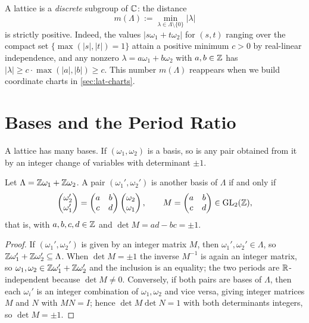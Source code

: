 \begin{remark}
\label{rem:lat-discrete}
A lattice is a \emph{discrete} subgroup of \(\mathbb{C}\): the distance
\[
  m(\Lambda) := \min_{\lambda \in \Lambda \setminus \{0\}} |\lambda|
\]
is strictly positive. Indeed, the values \(|s\omega_1 + t\omega_2|\) for
\((s,t)\) ranging over the compact set \(\{ \max(|s|,|t|) = 1\}\) attain a
positive minimum \(c > 0\) by real-linear independence, and any nonzero
\(\lambda = a\omega_1 + b\omega_2\) with \(a,b \in \mathbb{Z}\) has
\(|\lambda| \ge c \cdot \max(|a|,|b|) \ge c\). This number \(m(\Lambda)\) reappears
when we build coordinate charts in \cref{sec:lat-charts}.
\end{remark}

\section{Bases and the Period Ratio}
\label{sec:lat-basis}

A lattice has many bases. If \((\omega_1, \omega_2)\) is a basis, so is any pair
obtained from it by an integer change of variables with determinant \(\pm 1\).

\begin{proposition}
\label{prop:lat-basis-change}
Let \(\Lambda = \mathbb{Z}\omega_1 + \mathbb{Z}\omega_2\). A pair \((\omega_1', \omega_2')\) is
another basis of \(\Lambda\) if and only if
\[
  \begin{pmatrix} \omega_2' \\ \omega_1' \end{pmatrix}
  =
  \begin{pmatrix} a & b \\ c & d \end{pmatrix}
  \begin{pmatrix} \omega_2 \\ \omega_1 \end{pmatrix},
  \qquad
  M = \begin{pmatrix} a & b \\ c & d \end{pmatrix} \in \mathrm{GL}_2(\mathbb{Z}),
\]
that is, with \(a,b,c,d \in \mathbb{Z}\) and \(\det M = ad - bc = \pm 1\).
\end{proposition}

\begin{proof}
If \((\omega_1', \omega_2')\) is given by an integer matrix \(M\), then
\(\omega_1', \omega_2' \in \Lambda\), so \(\mathbb{Z}\omega_1' + \mathbb{Z}\omega_2' \subseteq
\Lambda\). When \(\det M = \pm 1\) the inverse \(M^{-1}\) is again an integer
matrix, so \(\omega_1, \omega_2 \in \mathbb{Z}\omega_1' + \mathbb{Z}\omega_2'\) and the inclusion
is an equality; the two periods are \(\mathbb{R}\)-independent because \(\det M \ne 0\).
Conversely, if both pairs are bases of \(\Lambda\), then each \(\omega_i'\) is an
integer combination of \(\omega_1, \omega_2\) and vice versa, giving integer
matrices \(M\) and \(N\) with \(MN = I\); hence \(\det M \det N = 1\) with both
determinants integers, so \(\det M = \pm 1\).
\end{proof}

